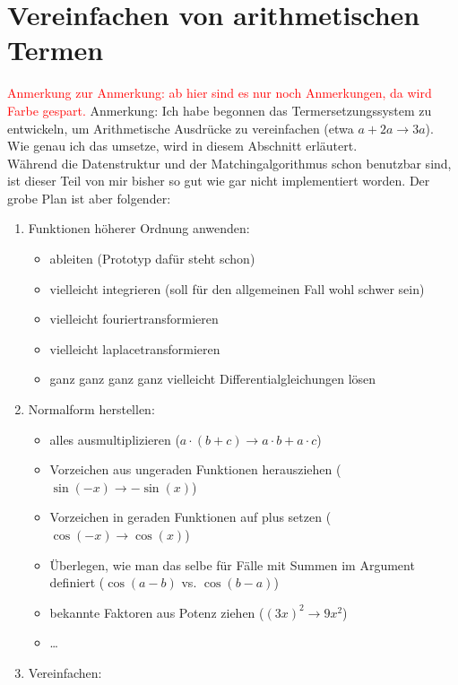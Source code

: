\documentclass{article}
\begin{document}
\section{Vereinfachen von arithmetischen Termen}
\begin{itshape}
\textcolor{red} {Anmerkung zur Anmerkung: ab hier sind es nur noch Anmerkungen, da wird Farbe gespart.}
Anmerkung: Ich habe begonnen das Termersetzungssystem zu entwickeln, um Arithmetische Ausdrücke zu vereinfachen (etwa $a + 2 a \rightarrow 3 a$). Wie genau ich das umsetze, wird in diesem Abschnitt erläutert.
\\Während die Datenstruktur und der Matchingalgorithmus schon benutzbar sind, ist dieser Teil von mir bisher so gut wie gar nicht implementiert worden. Der grobe Plan ist aber folgender:
\begin{enumerate}
    \item Funktionen höherer Ordnung anwenden:
    \begin{itemize}
        \item ableiten (Prototyp dafür steht schon)
        \item vielleicht integrieren (soll für den allgemeinen Fall wohl schwer sein)
        \item vielleicht fouriertransformieren
        \item vielleicht laplacetransformieren
        \item ganz ganz ganz ganz vielleicht Differentialgleichungen lösen
    \end{itemize}
    \item Normalform herstellen:
    \begin{itemize}
        \item alles ausmultiplizieren ($a\cdot (b + c) \rightarrow a\cdot b + a\cdot c$)
        \item Vorzeichen aus ungeraden Funktionen herausziehen ($\sin(-x) \rightarrow -\sin(x)$)
        \item Vorzeichen in geraden Funktionen auf plus setzen ($\cos(-x) \rightarrow \cos(x)$)
        \item Überlegen, wie man das selbe für Fälle mit Summen im Argument definiert ($\cos(a - b)$ vs. $\cos(b - a)$)
        \item bekannte Faktoren aus Potenz ziehen ($(3 x)^2 \rightarrow 9 x^2$)
        \item \dots
    \end{itemize}
    \item Vereinfachen:
    \begin{itemize}

\end{itemize}
\end{enumerate}
\end{itshape}
\end{document}
